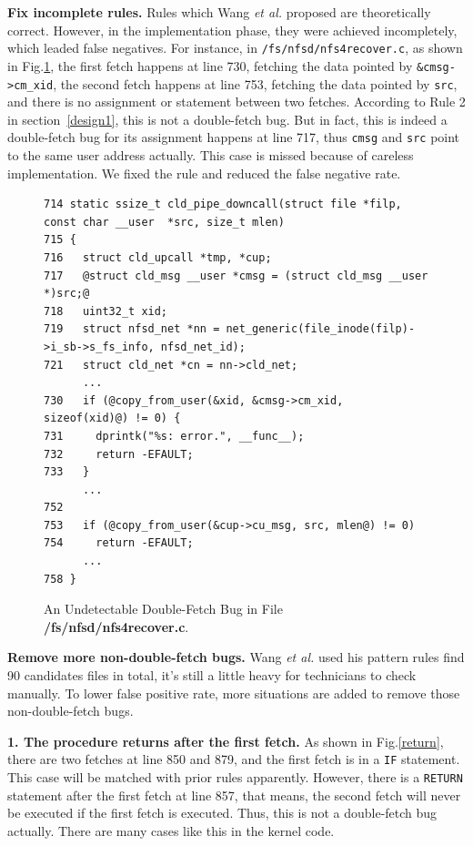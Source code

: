 \documentclass[10pt]{llncs}
\begin{document}
\textbf{Fix incomplete rules.}
Rules which Wang \textit{et al.} proposed are theoretically correct. However, in the implementation phase, they were achieved incompletely, which leaded false negatives. For instance, in \verb:/fs/nfsd/nfs4recover.c:, as shown in Fig.\ref{fix}, the first fetch happens at line 730, fetching the data pointed by \verb:&cmsg->cm_xid:, the second fetch happens at line 753, fetching the data pointed by \verb:src:, and there is no assignment or statement between two fetches. According to Rule 2 in section~\ref{design1}, this is not a double-fetch bug. But in fact, this is indeed a double-fetch bug for its assignment happens at line 717, thus \verb:cmsg: and \verb:src: point to the same user address actually. This case is missed because of careless implementation. We fixed the rule and reduced the false negative rate.

\begin{figure}[t]
  \centering
\begin{lstlisting}[style=code]
714 static ssize_t cld_pipe_downcall(struct file *filp, const char __user  *src, size_t mlen)
715 {
716   struct cld_upcall *tmp, *cup;
717   @struct cld_msg __user *cmsg = (struct cld_msg __user *)src;@
718   uint32_t xid;
719   struct nfsd_net *nn = net_generic(file_inode(filp)->i_sb->s_fs_info, nfsd_net_id);
721   struct cld_net *cn = nn->cld_net;
	  ...
730   if (@copy_from_user(&xid, &cmsg->cm_xid, sizeof(xid)@) != 0) {
731     dprintk("%s: error.", __func__);
732     return -EFAULT;
733   }
	  ...
752 
753   if (@copy_from_user(&cup->cu_msg, src, mlen@) != 0)
754     return -EFAULT;
	  ...
758 }
\end{lstlisting}
  \caption{An Undetectable Double-Fetch Bug in File \textbf{/fs/nfsd/nfs4recover.c}.}
  \label{fix}
\end{figure}


\textbf{Remove more non-double-fetch bugs.}
Wang \textit{et al.} used his pattern rules find 90 candidates files in total, it's still a little heavy for technicians to check manually. To lower false positive rate, more situations are added to remove those non-double-fetch bugs.

\textbf{1. The procedure returns after the first fetch.}
As shown in Fig.\ref{return}, there are two fetches at line 850 and 879, and the first fetch is in a \verb:IF: statement. This case will be matched with prior rules apparently. However, there is a \verb:RETURN: statement after the first fetch at line 857, that means, the second fetch will never be executed if the first fetch is executed. Thus, this is not a double-fetch bug actually. There are many cases like this in the kernel code.
\end{document}
